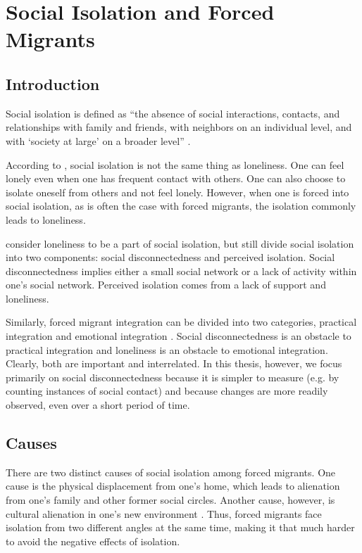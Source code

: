 \section{Social Isolation and Forced Migrants}
\label{sec:social_isolation}


\subsection*{Introduction}

Social isolation is defined as ``the absence of social interactions, contacts, and relationships with family and friends, with neighbors on an individual level, and with `society at large' on a broader level'' \cite{berg_social_1992}.

According to , social isolation is not the same thing as loneliness. One can feel lonely even when one has frequent contact with others. One can also choose to isolate oneself from others and not feel lonely. However, when one is forced into social isolation, as is often the case with forced migrants, the isolation commonly leads to loneliness.

 consider loneliness to be a part of social isolation, but still divide social isolation into two components: social disconnectedness and perceived isolation. Social disconnectedness implies either a small social network or a lack of activity within one's social network. Perceived isolation comes from a lack of support and loneliness.

Similarly, forced migrant integration can be divided into two categories, practical integration and emotional integration \cite{colic-peisker_croatians_2002}. Social disconnectedness is an obstacle to practical integration and loneliness is an obstacle to emotional integration. Clearly, both are important and interrelated. In this thesis, however, we focus primarily on social disconnectedness because it is simpler to measure (e.g. by counting instances of social contact) and because changes are more readily observed, even over a short period of time.


\subsection*{Causes}

There are two distinct causes of social isolation among forced migrants. One cause is the physical displacement from one's home, which leads to alienation from one's family and other former social circles. Another cause, however, is cultural alienation in one's new environment \cite{northcote_breaking_2006}. Thus, forced migrants face isolation from two different angles at the same time, making it that much harder to avoid the negative effects of isolation.


